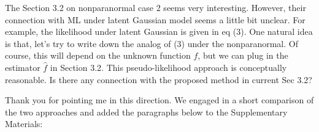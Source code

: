 \begin{point}
    The Section 3.2 on nonparanormal case 2 seems very interesting. However, their connection with ML under latent Gaussian model seems a little bit unclear. For example, the likelihood under latent Gaussian is given in eq (3). One natural idea is that, let's try to write down the analog of (3) under the nonparanormal. Of course, this will depend on the unknown function \(f\), but we can plug in the estimator \(\hat{f}\) in Section 3.2. This pseudo-likelihood approach is conceptually reasonable. Is there any connection with the proposed method in current Sec 3.2?
\end{point}

\begin{reply}
    Thank you for pointing me in this direction. We engaged in a short comparison of the two approaches and added the paragraphs below to the Supplementary Materials:
\end{reply}

